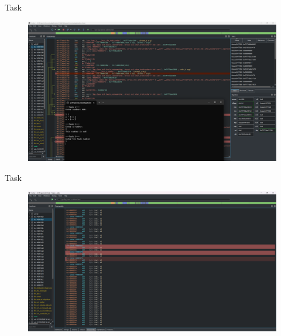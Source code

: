 \documentclass[a4paper,12pt]{article}
\newcommand{\RomanNumeralCaps}[1]{\MakeUppercase{\romannumeral #1}}
\begin{document}
\newpage
    \begin{center}
        \Large{Task \RomanNumeralCaps{3}}
    \end{center}
    \begin{figure}[h!]
        \begin{minipage}[h]{1\linewidth}
            \centering
            \includegraphics[width=1\linewidth]{Prt sc/3_1.png}  
        \end{minipage}
    \end{figure}
    \begin{center}
        \Large{Task \RomanNumeralCaps{4}}
    \end{center}
    \begin{figure}[h!]
        \begin{minipage}[h]{1\linewidth}
            \centering
            \includegraphics[width=1\linewidth]{Prt sc/4_0.png}  
        \end{minipage}
    \end{figure}
\end{document}
